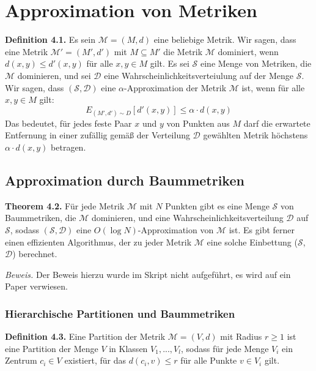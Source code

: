 \chapter{Approximation von Metriken}

\textbf{Definition 4.1.} Es sein $\mathcal{M} = (M, d)$ eine beliebige Metrik. Wir sagen, dass eine Metrik $\mathcal{M'} = (M', d')$ mit $M \subseteq M'$ die Metrik $\mathcal{M}$ dominiert, wenn $d(x, y) \le d'(x, y)$ für alle $x,y \in M$ gilt. Es sei $\mathcal{S}$ eine Menge von Metriken, die $\mathcal{M}$ dominieren, und sei $\mathcal{D}$ eine Wahrscheinlichkeitsverteiulung auf der Menge $\mathcal{S}$. Wir sagen, dass $(\mathcal{S}, \mathcal{D})$ eine $\alpha$-Approximation der Metrik $\mathcal{M}$ ist, wenn für alle $x, y \in M$ gilt:
$$E_{(M', d')\sim D} [d'(x, y)] \le \alpha \cdot d(x, y)$$
Das bedeutet, für jedes feste Paar $x$ und $y$ von Punkten aus $M$ darf die erwartete Entfernung in einer zufällig gemäß der Verteilung $\mathcal{D}$ gewählten Metrik höchstens $\alpha \cdot d(x, y)$ betragen.

\section{Approximation durch Baummetriken}

\textbf{Theorem 4.2.} Für jede Metrik $\mathcal{M}$ mit $N$ Punkten gibt es eine Menge $\mathcal{S}$ von Baummetriken, die $\mathcal{M}$ dominieren, und eine Wahrscheinlichkeitsverteilung $\mathcal{D}$ auf $\mathcal{S}$, sodass $(\mathcal{S}, \mathcal{D})$ eine $O(\log N)$-Approximation von $\mathcal{M}$ ist. Es gibt ferner einen effizienten Algorithmus, der zu jeder Metrik $\mathcal{M}$ eine solche Einbettung ($\mathcal{S}$, $\mathcal{D}$) berechnet.

\textit{Beweis.} Der Beweis hierzu wurde im Skript nicht aufgeführt, es wird auf ein Paper verwiesen.

\subsection{Hierarchische Partitionen und Baummetriken}

\textbf{Definition 4.3.} Eine Partition der Metrik $\mathcal{M} = (V, d)$ mit Radius $r \ge 1$ ist eine Partition der Menge $V$ in Klassen $V_{1}, ..., V_{l}$, sodass für jede Menge $V_{i}$ ein Zentrum $c_{i} \in V$ existiert, für das $d(c_{i}, v) \le r$ für alle Punkte $v \in V_{i}$ gilt.


